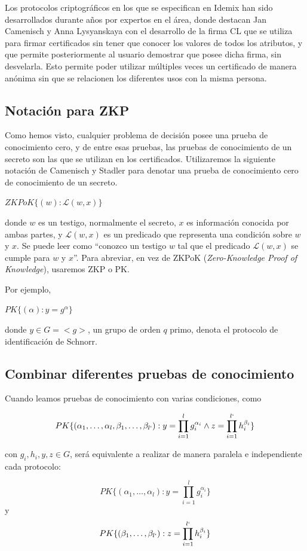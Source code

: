 Los protocolos criptográficos en los que se especifican en Idemix \citep{idemixSpec} han sido desarrollados durante años por expertos en el área, donde destacan Jan Camenisch y Anna Lysyanskaya con el desarrollo de la firma CL \citep{camenisch2002signature} \citep{camenisch2001efficient} que se utiliza para firmar certificados sin tener que conocer los valores de todos los atributos, y que permite posteriormente al usuario demostrar que posee dicha firma, sin desvelarla. Esto permite poder utilizar múltiples veces un certificado de manera anónima sin que se relacionen los diferentes usos con la misma persona.





\subsection{Notación para ZKP}

Como hemos visto, cualquier problema de decisión posee una prueba de conocimiento cero, y de entre esas pruebas, las pruebas de conocimiento de un secreto son las que se utilizan en los certificados. Utilizaremos la siguiente notación de Camenisch y Stadler \citep{camenisch1997efficient} para denotar una prueba de conocimiento cero de conocimiento de un secreto.

\begin{center}
	$ZKPoK\{ (w) : \mathcal{L}(w,x) \}$
\end{center}
donde $w$ es un testigo, normalmente el secreto, $x$ es información conocida por ambas partes, y $\mathcal{L}(w,x)$ es un predicado que representa una condición sobre $w$ y $x$. Se puede leer como ``conozco un testigo $w$ tal que el predicado $\mathcal{L}(w,x)$ se cumple para $w$ y $x$''. Para abreviar, en vez de ZKPoK (\textit{Zero-Knowledge Proof of Knowledge}), usaremos ZKP o PK.

\hfil

Por ejemplo,
\begin{center}
	$PK\{ (\alpha) : y=g^\alpha \}$
\end{center}
donde $y\in G = <g>$, un grupo de orden $q$ primo, denota el protocolo de identificación de Schnorr.


\subsection{Combinar diferentes pruebas de conocimiento}

Cuando leamos pruebas de conocimiento con varias condiciones, como
\begin{center}
	$$
	PK\{ (\alpha_1,\dots,\alpha_l,\beta_1,\dots,\beta_{l`}) : y=\prod_{i=1}^{l}g_i^{\alpha_i} \wedge z=\prod_{i=1}^{l`}h_i^{\beta_i} \}
	$$
\end{center}
con $g_i,h_i,y,z\in G$, será equivalente a realizar de manera paralela e independiente cada protocolo:
\begin{center}
	$$
	PK\{ (\alpha_1,\dots,\alpha_l) : y=\prod_{i=1}^{l}g_i^{\alpha_i} \}
	$$
	y
	$$
	PK\{ (\beta_1,\dots,\beta_{l`}) : z=\prod_{i=1}^{l`}h_i^{\beta_i} \}
	$$
\end{center}


